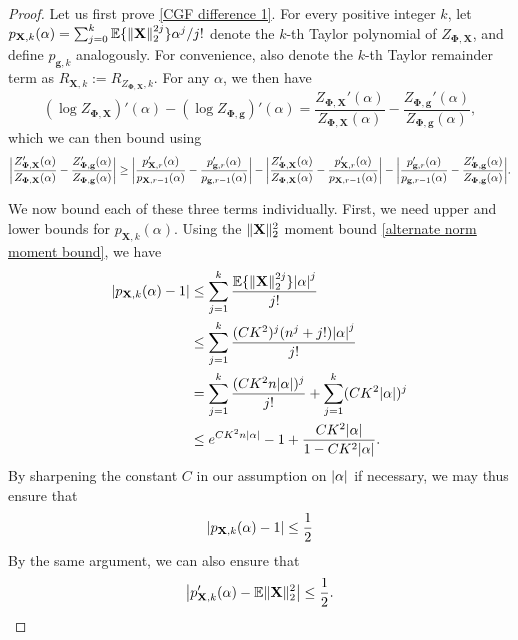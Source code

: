 \documentclass[final,12pt]{colt2018} %
\numberwithin{equation}{section}
\DeclarePairedDelimiter{\abs}{\lvert}{\rvert}
\DeclarePairedDelimiter{\norm}{\lVert}{\rVert}
\DeclarePairedDelimiter{\braces}{\lbrace}{\rbrace}
\newcommand{\E}{\mathbb{E}}
\newcommand{\boldg}{\textbf{g}}
\newcommand{\boldPhi}{\boldsymbol{\Phi}}
\newcommand{\boldX}{\textbf{X}}
\begin{document}
\begin{proof}
	Let us first prove \eqref{CGF difference 1}. For every positive integer $k$, let $p_{\boldX,k}(\alpha) = \sum_{j=0}^k \E\braces{\norm{\boldX}_2^{2j}}\alpha^j/j!$ denote the $k$-th Taylor polynomial of $Z_{\boldPhi,\boldX}$, and define $p_{\boldg,k}$ analogously. For convenience, also denote the $k$-th Taylor remainder term as $R_{\boldX,k} := R_{Z_{\boldPhi,\boldX},k}$. For any $\alpha$, we then have
	\begin{equation}
	(\log Z_{\boldPhi,\boldX})'(\alpha)-(\log Z_{\boldPhi,\boldg})'(\alpha) = \frac{Z_{\boldPhi,\boldX}'(\alpha)}{Z_{\boldPhi,\boldX}(\alpha)} - \frac{Z_{\boldPhi,\boldg}'(\alpha)}{Z_{\boldPhi,\boldg}(\alpha)},
	\end{equation}
	which we can then bound using
	\begin{align} \label{CGF difference}
	\abs*{\frac{Z_{\boldPhi,\boldX}'(\alpha)}{Z_{\boldPhi,\boldX}(\alpha)} - \frac{Z_{\boldPhi,\boldg}'(\alpha)}{Z_{\boldPhi,\boldg}(\alpha)}} \geq \abs*{\frac{p_{\boldX,r}'(\alpha)}{p_{\boldX,r-1}(\alpha)} - \frac{p_{\boldg,r}'(\alpha)}{p_{\boldg,r-1}(\alpha)}} - \abs*{\frac{Z_{\boldPhi,\boldX}'(\alpha)}{Z_{\boldPhi,\boldX}(\alpha)} - \frac{p_{\boldX,r}'(\alpha)}{p_{\boldX,r-1}(\alpha)}} - \abs*{\frac{p_{\boldg,r}'(\alpha)}{p_{\boldg,r-1}(\alpha)} - \frac{Z_{\boldPhi,\boldg}'(\alpha)}{Z_{\boldPhi,\boldg}(\alpha)}}.
	\end{align}
	
	We now bound each of these three terms individually. First, we need upper and lower bounds for $p_{\boldX,k}(\alpha)$. Using the $\norm{\boldX}_2^2$ moment bound \eqref{alternate norm moment bound}, we have
	\begin{align*}
	\abs*{p_{\boldX,k}(\alpha) -1} & \leq \sum_{j=1}^k \frac{\E\braces{\norm{\boldX}_2^{2j}}\abs*{\alpha}^j}{j!} \\
	& \leq \sum_{j=1}^k \frac{(CK^2)^{j}(n^j+j!)\abs*{\alpha}^j}{j!} \\
	& = \sum_{j=1}^k \frac{(CK^2n\abs{\alpha})^j}{j!} + \sum_{j=1}^k (CK^2\abs{\alpha})^j \\
	& \leq e^{CK^2n\abs{\alpha}}-1 + \frac{CK^2\abs{\alpha}}{1-CK^2\abs{\alpha}}.
	\end{align*}
	By sharpening the constant $C$ in our assumption on $\abs{\alpha}$ if necessary, we may thus ensure that
	\begin{align} \label{Taylor poly bounds}
	\abs*{p_{\boldX,k}(\alpha) -1} \leq \frac{1}{2}
	\end{align}
	By the same argument, we can also ensure that
	\begin{align} \label{Taylor poly derivative bounds}
	\abs*{p_{\boldX,k}'(\alpha) - \E\norm{\boldX}^2_2} \leq \frac{1}{2}.
	\end{align}
	

\end{proof}
\end{document}
